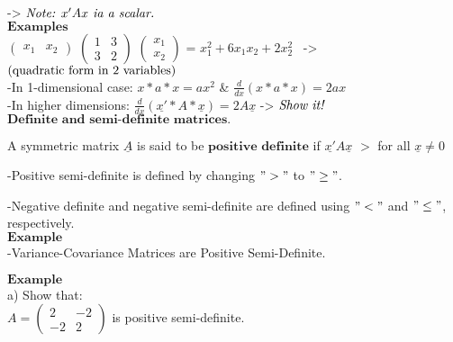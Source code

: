 \documentclass[]{article}
\begin{document}
-\textgreater{} \(\text{\textit{Note: $x'Ax$ ia a scalar.}}\)\\

\(\mathbf{Examples}\)\\

\(\begin{pmatrix} x_1 & x_2 \end{pmatrix}\)
\(\begin{pmatrix} 1 & 3 \\ 3 & 2 \end{pmatrix}\)
\(\begin{pmatrix} x_1 \\ x_2 \end{pmatrix}\) =
\({x^{2}_1 + 6x_1x_2 + 2x^{2}_2}\)~
-\textgreater{}\(\text{\text{(quadratic form in 2 variables)}}\)\\

-In 1-dimensional case: \(x*a*x = ax^2\) \&
\(\frac{d}{dx}(x*a*x)=2ax\)\\

-In higher dimensions:
\(\frac{d}{dx}(\underline{x'}*A*\underline{x})=2A\underline{x}\)
-\textgreater{} \(\text{\textit{Show it!}}\)\\

\(\textbf{Definite and semi-definite matrices.}\)\\

\begin{tcolorbox}[colback=green!5,colframe=red!40!black,title=Definition]
A symmetric matrix $\underline{A}$ is said to be $\textbf{positive definite}$ if $\underline{x'}A\underline{x}$  $>$ for all $\underline{x}\neq0$



\end{tcolorbox}

-Positive semi-definite is defined by changing \(">"\) to \("\geq"\).

-Negative definite and negative semi-definite are defined using \("<"\)
and \("\leq"\), respectively.\\

\(\mathbf{Example}\)\\

-Variance-Covariance Matrices are Positive Semi-Definite.\\

\newpage  

\(\mathbf{Example}\)\\
 a) Show that:\\
 \(A=\begin{pmatrix} 2 & -2 \\ -2 & 2 \end{pmatrix}\) is positive
semi-definite.\\
\end{document}
